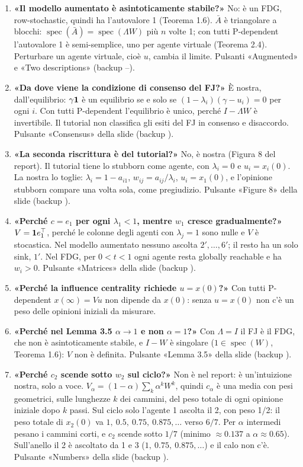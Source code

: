 \begin{enumerate}[leftmargin=1.6em,itemsep=3pt]
  \item \textbf{«Il modello aumentato è asintoticamente stabile?»} No: è un FDG, row-stochastic, quindi ha l'autovalore 1 (Teorema 1.6). $\bar A$ è triangolare a blocchi: $\operatorname{spec}(\bar A)=\operatorname{spec}(\Lambda W)$ più $n$ volte 1; con tutti P-dependent l'autovalore 1 è semi-semplice, uno per agente virtuale (Teorema 2.4). Perturbare un agente virtuale, cioè $u$, cambia il limite. Pulsanti «Augmented» e «Two descriptions» (backup --).
  \item \textbf{«Da dove viene la condizione di consenso del FJ?»} È nostra, dall'equilibrio: $\gamma\mathbf{1}$ è un equilibrio se e solo se $(1-\lambda_i)(\gamma-u_i)=0$ per ogni $i$. Con tutti P-dependent l'equilibrio è unico, perché $I-\Lambda W$ è invertibile. Il tutorial non classifica gli esiti del FJ in consenso e disaccordo. Pulsante «Consensus» della slide  (backup ).
  \item \textbf{«La seconda riscrittura è del tutorial?»} No, è nostra (Figura 8 del report). Il tutorial tiene lo stubborn come agente, con $\lambda_i=0$ e $u_i=x_i(0)$. La nostra lo toglie: $\lambda_i=1-a_{i1}$, $w_{ij}=a_{ij}/\lambda_i$, $u_i=x_1(0)$, e l'opinione stubborn compare una volta sola, come pregiudizio. Pulsante «Figure 8» della slide  (backup ).
  \item \textbf{«Perché $c=e_1$ per ogni $\lambda_1<1$, mentre $w_1$ cresce gradualmente?»} $V=\mathbf{1} e_1^\top$, perché le colonne degli agenti con $\lambda_j=1$ sono nulle e $V$ è stocastica. Nel modello aumentato nessuno ascolta $2',\dots,6'$; il resto ha un solo sink, $1'$. Nel FDG, per $0<t<1$ ogni agente resta globally reachable e ha $w_i>0$. Pulsante «Matrices» della slide  (backup ).
  \item \textbf{«Perché la influence centrality richiede $u=x(0)$?»} Con tutti P-dependent $x(\infty)=Vu$ non dipende da $x(0)$: senza $u=x(0)$ non c'è un peso delle opinioni iniziali da misurare.
  \item \textbf{«Perché nel Lemma 3.5 $\alpha\to1$ e non $\alpha=1$?»} Con $\Lambda=I$ il FJ è il FDG, che non è asintoticamente stabile, e $I-W$ è singolare ($1\in\operatorname{spec}(W)$, Teorema 1.6): $V$ non è definita. Pulsante «Lemma 3.5» della slide  (backup ).
  \item \textbf{«Perché $c_2$ scende sotto $w_2$ sul ciclo?»} Non è nel report: è un'intuizione nostra, solo a voce. $V_\alpha=(1-\alpha)\sum_k\alpha^kW^k$, quindi $c_\alpha$ è una media con pesi geometrici, sulle lunghezze $k$ dei cammini, del peso totale di ogni opinione iniziale dopo $k$ passi. Sul ciclo solo l'agente 1 ascolta il 2, con peso 1/2: il peso totale di $x_2(0)$ va $1,\ 0.5,\ 0.75,\ 0.875,\dots$ verso $6/7$. Per $\alpha$ intermedi pesano i cammini corti, e $c_2$ scende sotto $1/7$ (minimo $\approx0.137$ a $\alpha\approx0.65$). Sull'anello il 2 è ascoltato da 1 e 3 ($1,\ 0.75,\ 0.875,\dots$) e il calo non c'è. Pulsante «Numbers» della slide  (backup ).

\end{enumerate}
